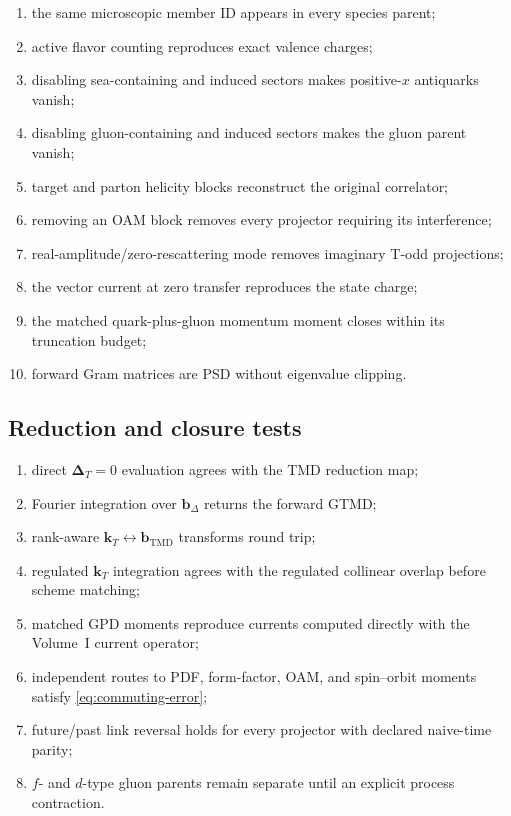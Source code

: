 \documentclass[11pt]{article}
\newcommand{\kT}{\bm{k}_{T}}
\newcommand{\DT}{\bm{\Delta}_{T}}
\newcommand{\bD}{\bm{b}_{\Delta}}
\newcommand{\bM}{\bm{b}_{\mathrm{TMD}}}
\begin{document}
\begin{enumerate}
\item the same microscopic member ID appears in every species parent;
\item active flavor counting reproduces exact valence charges;
\item disabling sea-containing and induced sectors makes positive-\(x\)
      antiquarks vanish;
\item disabling gluon-containing and induced sectors makes the gluon parent
      vanish;
\item target and parton helicity blocks reconstruct the original correlator;
\item removing an OAM block removes every projector requiring its
      interference;
\item real-amplitude/zero-rescattering mode removes imaginary T-odd
      projections;
\item the vector current at zero transfer reproduces the state charge;
\item the matched quark-plus-gluon momentum moment closes within its
      truncation budget;
\item forward Gram matrices are PSD without eigenvalue clipping.
\end{enumerate}

\subsection{Reduction and closure tests}

\begin{enumerate}
\item direct \(\DT=0\) evaluation agrees with the TMD reduction map;
\item Fourier integration over \(\bD\) returns the forward GTMD;
\item rank-aware \(\kT\leftrightarrow\bM\) transforms round trip;
\item regulated \(\kT\) integration agrees with the regulated collinear
      overlap before scheme matching;
\item matched GPD moments reproduce currents computed directly with the
      Volume~I current operator;
\item independent routes to PDF, form-factor, OAM, and spin--orbit moments
      satisfy \cref{eq:commuting-error};
\item future/past link reversal holds for every projector with declared
      naive-time parity;
\item \(f\)- and \(d\)-type gluon parents remain separate until an explicit
      process contraction.
\end{enumerate}
\end{document}
